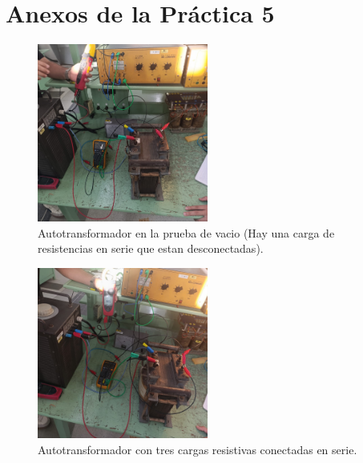 \section{Anexos de la Práctica 5}
\begin{figure}[h] %
    \centering
    \includegraphics[width=0.5\textwidth]{fot/prac5_autoenvacio.jpeg} %
    \caption{Autotransformador en la prueba de vacio (Hay una carga de resistencias en serie que estan desconectadas).}
    \label{fig:prac5_autoenvacio}
\end{figure}

\begin{figure}[h] %
    \centering
    \includegraphics[width=0.5\textwidth]{fot/prac5_autoR_.jpeg} %
    \caption{Autotransformador con tres cargas resistivas conectadas en serie.}
    \label{fig:AutoR1}
\end{figure}